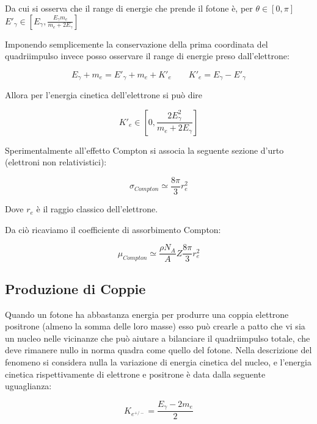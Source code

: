 Da cui si osserva che il range di energie che prende il fotone è, per $\theta \in [0,\pi]$ $E'_{\gamma} \in [E_{\gamma},\frac{E_{\gamma}m_e}{m_e+2E_{\gamma}}]$

Imponendo semplicemente la conservazione della prima coordinata del quadriimpulso invece posso osservare il range di energie preso dall'elettrone:

\begin{equation}
E_{\gamma}+m_e=E'_{\gamma}+m_e+K'_e \qquad K'_e=E_{\gamma}-E'_{\gamma}
\end{equation}

Allora per l'energia cinetica dell'elettrone si può dire

\begin{equation}
K'_e \in [0, \frac{2E_{\gamma}^2}{m_e+2E_{\gamma}}]
\end{equation}

Sperimentalmente all'effetto Compton si associa la seguente sezione d'urto (elettroni non relativistici):

\begin{equation}
\sigma_{Compton}\simeq\frac{8\pi}{3}r_{e}^2
\end{equation}

Dove $r_{e}$ è il raggio classico dell'elettrone.

Da ciò ricaviamo il coefficiente di assorbimento Compton:

\begin{equation}
\mu_{Compton}\simeq\frac{\rho N_{A}}{A}Z\frac{8\pi}{3}r_{e}^2
\end{equation}

\subsection{Produzione di Coppie}

Quando un fotone ha abbastanza energia per produrre una coppia elettrone positrone (almeno la somma delle loro masse) esso può crearle a patto che vi sia un nucleo nelle vicinanze che può aiutare a bilanciare il quadriimpulso totale, che deve rimanere nullo in norma quadra come quello del fotone. 
Nella descrizione del fenomeno si considera nulla la variazione di energia cinetica del nucleo, e l'energia cinetica rispettivamente di elettrone e positrone è data dalla seguente uguaglianza:

\begin{equation}
K_{e^{+/-}}=\frac{E_{\gamma}-2m_e}{2}
\end{equation}

